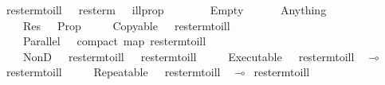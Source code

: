 \ res{\isacharunderscore}term{\isacharunderscore}to{\isacharunderscore}ill\ {\isacharcolon}{\isacharcolon}\ {\isachardoublequoteopen}\ res{\isacharunderscore}term\ {\isasymRightarrow}\ \ ill{\isacharunderscore}prop{\isachardoublequoteclose}\isanewline
\ \ \isanewline
\ \ \ \ \ Empty\ {\isacharequal}\ {\isasymone}{\isachardoublequoteclose}\isanewline
\ \ {\isacharbar}\ \ Anything\ {\isacharequal}\ {\isasymtop}{\isachardoublequoteclose}\isanewline
\ \ {\isacharbar}\ \ {\isacharparenleft}Res\ \ {\isacharequal}\ Prop\ \isanewline
\ \ {\isacharbar}\ \ {\isacharparenleft}Copyable\ \ {\isacharequal}\ {\isacharbang}{\isacharparenleft}res{\isacharunderscore}term{\isacharunderscore}to{\isacharunderscore}ill\ \isanewline
\ \ {\isacharbar}\ \ {\isacharparenleft}Parallel\ \ {\isacharequal}\ compact\ {\isacharparenleft}map\ res{\isacharunderscore}term{\isacharunderscore}to{\isacharunderscore}ill\ \isanewline
\ \ {\isacharbar}\ \ {\isacharparenleft}NonD\ \ {\isacharequal}\ {\isacharparenleft}res{\isacharunderscore}term{\isacharunderscore}to{\isacharunderscore}ill\ \ {\isasymoplus}\ {\isacharparenleft}res{\isacharunderscore}term{\isacharunderscore}to{\isacharunderscore}ill\ \isanewline
\ \ {\isacharbar}\ \ {\isacharparenleft}Executable\ \ {\isacharequal}\ {\isacharparenleft}res{\isacharunderscore}term{\isacharunderscore}to{\isacharunderscore}ill\ \ $\multimap$\ {\isacharparenleft}res{\isacharunderscore}term{\isacharunderscore}to{\isacharunderscore}ill\ \isanewline
\ \ {\isacharbar}\ \ {\isacharparenleft}Repeatable\ \ {\isacharequal}\ {\isacharbang}{\isacharparenleft}{\isacharparenleft}res{\isacharunderscore}term{\isacharunderscore}to{\isacharunderscore}ill\ \ $\multimap$\ {\isacharparenleft}res{\isacharunderscore}term{\isacharunderscore}to{\isacharunderscore}ill\ 
